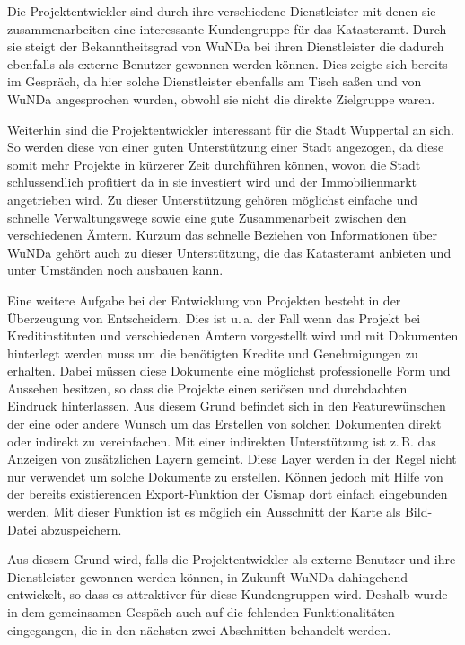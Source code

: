 Die Projektentwickler sind durch ihre verschiedene Dienstleister mit denen sie zusammenarbeiten eine interessante Kundengruppe für das Katasteramt.
Durch sie steigt der Bekanntheitsgrad von \ac{WuNDa} bei ihren Dienstleister die dadurch ebenfalls als externe Benutzer gewonnen werden können.
Dies zeigte sich bereits im Gespräch, da hier solche Dienstleister ebenfalls am Tisch saßen und von \ac{WuNDa} angesprochen wurden, obwohl sie nicht die direkte Zielgruppe waren.

Weiterhin sind die Projektentwickler interessant für die Stadt Wuppertal an sich.
So werden diese von einer guten Unterstützung einer Stadt angezogen, da diese somit mehr Projekte in kürzerer Zeit durchführen können, wovon die Stadt schlussendlich profitiert da in sie investiert wird und der Immobilienmarkt angetrieben wird.
Zu dieser Unterstützung gehören möglichst einfache und schnelle Verwaltungswege sowie eine gute Zusammenarbeit zwischen den verschiedenen Ämtern.
Kurzum das schnelle Beziehen von Informationen über \ac{WuNDa} gehört auch zu dieser Unterstützung, die das Katasteramt anbieten und unter Umständen noch ausbauen kann.

Eine weitere Aufgabe bei der Entwicklung von Projekten besteht in der Überzeugung von Entscheidern.
Dies ist u.\,a. der Fall wenn das Projekt bei Kreditinstituten und verschiedenen Ämtern vorgestellt wird und mit Dokumenten hinterlegt werden muss um die benötigten Kredite und Genehmigungen zu erhalten.
Dabei müssen diese Dokumente eine möglichst professionelle Form und Aussehen besitzen, so dass die Projekte einen seriösen und durchdachten Eindruck hinterlassen.
Aus diesem Grund befindet sich in den Featurewünschen der eine oder andere Wunsch um das Erstellen von solchen Dokumenten direkt oder indirekt zu vereinfachen.
Mit einer indirekten Unterstützung ist z.\,B. das Anzeigen von zusätzlichen Layern gemeint.
Diese Layer werden in der Regel nicht nur verwendet um solche Dokumente zu erstellen.
Können jedoch mit Hilfe von der bereits existierenden Export-Funktion der Cismap dort einfach eingebunden werden.
Mit dieser Funktion ist es möglich ein Ausschnitt der Karte als Bild-Datei abzuspeichern. 

Aus diesem Grund wird, falls die Projektentwickler als externe Benutzer und ihre Dienstleister gewonnen werden können, in Zukunft \ac{WuNDa} dahingehend entwickelt, so dass es attraktiver für diese Kundengruppen wird.
Deshalb wurde in dem gemeinsamen Gespäch auch auf die fehlenden Funktionalitäten eingegangen, die in den nächsten zwei Abschnitten behandelt werden.

